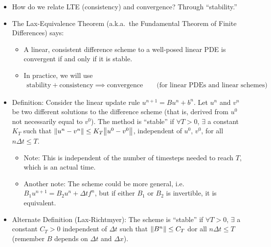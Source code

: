 \documentclass{article}
\newcommand{\Dx}{\Delta x}
\newcommand{\Dt}{\Delta t}
\begin{document}
            \begin{itemize}
                \item How do we relate LTE (consistency) and convergence?  Through ``stability.''
                \item The Lax-Equivalence Theorem (a.k.a.~the Fundamental Theorem of Finite Differences) says:
                \begin{itemize}
                    \item A linear, consistent difference scheme to a well-posed linear PDE is convergent if and only if it is stable.
                    \item In practice, we will use
                    \begin{align}
                        \text{stability} + \text{consistency} \implies \text{convergence} \qquad \text{(for linear PDEs and linear schemes)}
                    \end{align}
                \end{itemize}
                \item Definition: Consider the linear update rule $u^{n+1} = Bu^n + b^n$.  Let $u^n$ and $v^n$ be two different solutions to the difference scheme (that is, derived from $u^0$ not necessarily equal to $v^0$).  The method is ``stable'' if $\forall T > 0$, $\exists$ a constant $K_T$ such that $\norm{u^n - v^n} \leq K_T\norm{u^0 - v^0}$, independent of $u^0$, $v^0$, for all $n\Dt \leq T$.
                \begin{itemize}
                    \item Note: This is independent of the number of timesteps needed to reach $T$, which is an actual time.
                    \item Another note: The scheme could be more general, i.e.~$B_1u^{n+1} = B_2u^n + \Dt f^n$, but if either $B_1$ or $B_2$ is invertible, it is equivalent.
                \end{itemize}
                \item Alternate Definition (Lax-Richtmyer): The scheme is ``stable'' if  $\forall T > 0$, $\exists$ a constant $C_T > 0$ independent of $\Dt$ such that $\norm{B^n} \leq C_T$ dor all $n\Dt \leq T$ (remember $B$ depends on $\Dt$ and $\Dx$).
            \end{itemize}
\end{document}
